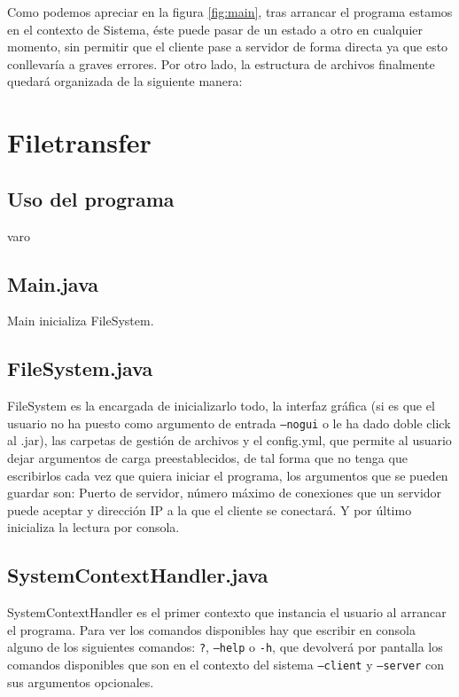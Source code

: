 \documentclass[a4paper, 12pt]{report}
\begin{document}
Como podemos apreciar en la figura \ref{fig:main}, tras arrancar el programa estamos en el contexto de Sistema, éste puede pasar de un estado a otro en cualquier momento, sin permitir que el cliente pase a servidor de forma directa ya que esto conllevaría a graves errores.
Por otro lado, la estructura de archivos finalmente quedará organizada de la siguiente manera:

\newpage
\begin{figure}
\end{figure}

\chapter{Filetransfer}
\section{Uso del programa}
varo
\section{Main.java}
Main inicializa FileSystem.
\section{FileSystem.java}
FileSystem es la encargada de inicializarlo todo, la interfaz gráfica (si es que el usuario no ha puesto como argumento de entrada \texttt{--nogui} o le ha dado doble click al .jar), las carpetas de gestión de archivos y el config.yml, que permite al usuario dejar argumentos de carga preestablecidos, de tal forma que no tenga que escribirlos cada vez que quiera iniciar el programa, los argumentos que se pueden guardar son:
Puerto de servidor, número máximo de conexiones que un servidor puede aceptar y dirección IP a la que el cliente se conectará.
Y por último inicializa la lectura por consola.
\section{SystemContextHandler.java}
SystemContextHandler es el primer contexto que instancia el usuario al arrancar el programa. 
Para ver los comandos disponibles hay que escribir en consola alguno de los siguientes comandos: 
\texttt{?}, \texttt{--help} o \texttt{-h}, que devolverá por pantalla los comandos disponibles que son 
en el contexto del sistema \texttt{--client} y \texttt{--server} con sus argumentos opcionales.
\end{document}
